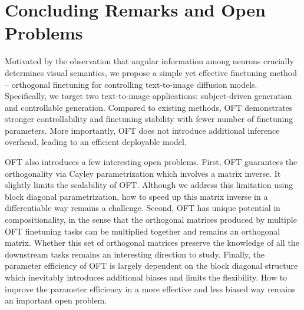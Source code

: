 \section{Concluding Remarks and Open Problems}

Motivated by the observation that angular information among neurons crucially determines visual semantics, we propose a simple yet effective finetuning method – orthogonal finetuning for controlling text-to-image diffusion models. Specifically, we target two text-to-image applications: subject-driven generation and controllable generation. Compared to existing methods, OFT demonstrates stronger controllability and finetuning stability with fewer number of finetuning parameters. More importantly, OFT does not introduce additional inference overhead, leading to an efficient deployable model.

OFT also introduces a few interesting open problems. First, OFT guarantees the orthogonality via Cayley parametrization which involves a matrix inverse. It slightly limits the scalability of OFT. Although we address this limitation using block diagonal parametrization, how to speed up this matrix inverse in a differentiable way remains a challenge. Second, OFT has unique potential in compositionality, in the sense that the orthogonal matrices produced by multiple OFT finetuning tasks can be multiplied together and remains an orthogonal matrix. Whether this set of orthogonal matrices preserve the knowledge of all the downstream tasks remains an interesting direction to study. Finally, the parameter efficiency of OFT is largely dependent on the block diagonal structure which inevitably introduces additional biases and limits the flexibility. How to improve the parameter efficiency in a more effective and less biased way remains an important open problem.


